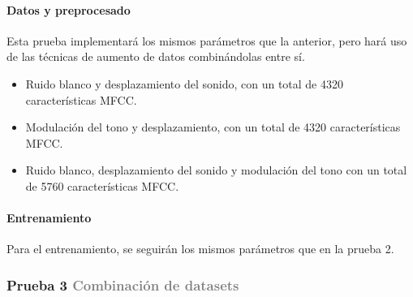 \documentclass[11pt,a4paper,spanish]{book}
\begin{document}
	\hfill\begin{minipage}[t]{\dimexpr\textwidth-1cm}
		\paragraph{Datos y preprocesado}Esta prueba implementará los mismos parámetros que la anterior, pero hará uso de las técnicas de aumento de datos combinándolas entre sí.
		\begin{itemize}
			\item Ruido blanco y desplazamiento del sonido, con un total de 4320 características MFCC.
			
			\item Modulación del tono y desplazamiento, con un total de 4320 características MFCC.
			
			\item Ruido blanco, desplazamiento del sonido y modulación del tono con un total de 5760 características MFCC.
		\end{itemize}

		\paragraph{Entrenamiento} Para el entrenamiento, se seguirán los mismos parámetros que en la prueba 2.	
	\end{minipage}

	\subsubsection[]{\large Prueba 3 {\normalsize \textcolor{Gray}{Combinación de datasets}}}
	
\end{document}
